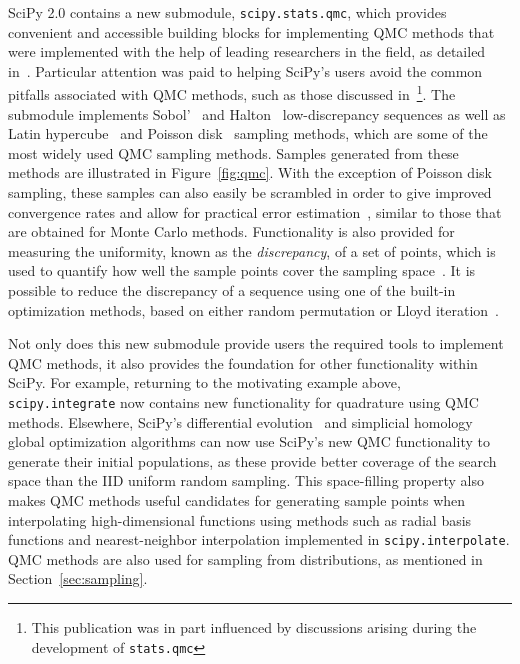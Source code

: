 \documentclass[acmsmall]{acmart}
\begin{document}
SciPy 2.0 contains a new submodule, \texttt{scipy.stats.qmc}, which provides
convenient and accessible building blocks for implementing QMC methods
that were implemented with the help of leading researchers in the field, as
detailed in~\cite{Roy2023}. Particular attention was paid to helping SciPy's users avoid the
common pitfalls associated with QMC methods, such as those discussed
in~\cite{Art2020}\footnote{This publication was in part influenced by discussions
arising during the development of \texttt{stats.qmc}}.
The submodule implements Sobol'~\cite{Sobol1967,Joe2008} and
Halton~\cite{Halton1960,Halton1964} low-discrepancy sequences as well as
Latin hypercube~\cite{McKay1979,Iman1981} and Poisson disk~\cite{Cook1986,Bridson2007}
sampling methods, which are some of the most widely used QMC sampling methods. Samples generated
from these methods are illustrated in Figure~\ref{fig:qmc}. With the exception of
Poisson disk sampling, these samples can also
easily be scrambled in order to give improved convergence rates and allow for practical
error estimation~\cite{Owen1998,Owen2003}, similar to those that are obtained for Monte
Carlo methods. Functionality is also provided for measuring the uniformity, known as the
\emph{discrepancy}, of a set of points, which is used to quantify how well the sample
points cover the sampling space~\cite{Zhou2013,Warnock1972,Warnock1995,Franco2009}.
It is possible to reduce the discrepancy of a sequence using one of the built-in
optimization methods, based on either random permutation or Lloyd
iteration~\cite{Lloyd1982}.

Not only does this new submodule provide users the required tools to implement
QMC methods, it also provides the foundation for other functionality within SciPy.
For example, returning to the motivating example above, \texttt{scipy.integrate} now
contains new functionality for quadrature using QMC methods.
Elsewhere, SciPy's differential evolution~\cite{Storn1997} and
simplicial homology~\cite{Endres2018} global optimization algorithms can now use SciPy's
new QMC functionality to generate their initial populations, as these provide better coverage
of the search space than the IID uniform random sampling. This space-filling property
also makes QMC methods useful candidates for generating sample points when
interpolating high-dimensional functions using methods such as radial basis functions
and nearest-neighbor interpolation implemented in \texttt{scipy.interpolate}.
QMC methods are also used for sampling from distributions, as mentioned in
Section~\ref{sec:sampling}.
\end{document}
